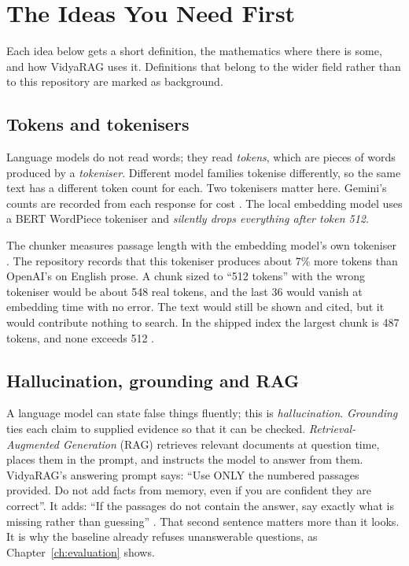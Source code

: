 \chapter{The Ideas You Need First}
\label{ch:concepts}

Each idea below gets a short definition, the mathematics where there is some, and how VidyaRAG uses it. Definitions that belong to the wider field rather than to this repository are marked as background.

\section{Tokens and tokenisers}

Language models do not read words; they read \emph{tokens}, which are pieces of words produced by a \emph{tokeniser}. Different model families tokenise differently, so the same text has a different token count for each. Two tokenisers matter here. Gemini's counts are recorded from each response for cost . The local embedding model  uses a BERT WordPiece tokeniser and \emph{silently drops everything after token 512}.

\begin{keyidea}
The chunker measures passage length with the embedding model's own tokeniser . The repository records that this tokeniser produces about 7\% more tokens than OpenAI's  on English prose. A chunk sized to ``512 tokens'' with the wrong tokeniser would be about 548 real tokens, and the last 36 would vanish at embedding time with no error. The text would still be shown and cited, but it would contribute nothing to search. In the shipped index the largest chunk is 487 tokens, and none exceeds 512 \tagM.
\end{keyidea}

\section{Hallucination, grounding and RAG}

A language model can state false things fluently; this is \emph{hallucination}. \emph{Grounding} ties each claim to supplied evidence so that it can be checked. \emph{Retrieval-Augmented Generation} (RAG) retrieves relevant documents at question time, places them in the prompt, and instructs the model to answer from them. VidyaRAG's answering prompt says: \enquote{Use ONLY the numbered passages provided. Do not add facts from memory, even if you are confident they are correct}. It adds: \enquote{If the passages do not contain the answer, say exactly what is missing rather than guessing} . That second sentence matters more than it looks. It is why the baseline already refuses unanswerable questions, as Chapter~\ref{ch:evaluation} shows.

